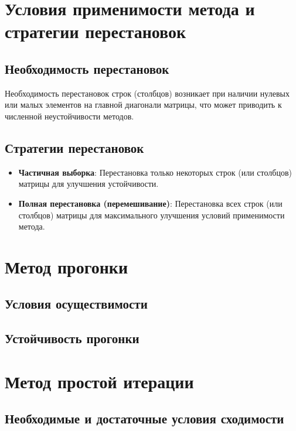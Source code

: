 \documentclass{article}
\begin{document}
\section{Условия применимости метода и стратегии перестановок}

\subsection{Необходимость перестановок}

Необходимость перестановок строк (столбцов) возникает при наличии нулевых или малых элементов на главной диагонали матрицы, что может приводить к численной неустойчивости методов.

\subsection{Стратегии перестановок}

\begin{itemize}
  \item \textbf{Частичная выборка}: Перестановка только некоторых строк (или столбцов) матрицы для улучшения устойчивости.
  
  \item \textbf{Полная перестановка (перемешивание)}: Перестановка всех строк (или столбцов) матрицы для максимального улучшения условий применимости метода.
\end{itemize}


\section{Метод прогонки}

\subsection{Условия осуществимости}
\subsection{Устойчивость прогонки}

\section{Метод простой итерации}

\subsection{Необходимые и достаточные условия сходимости}
\end{document}
